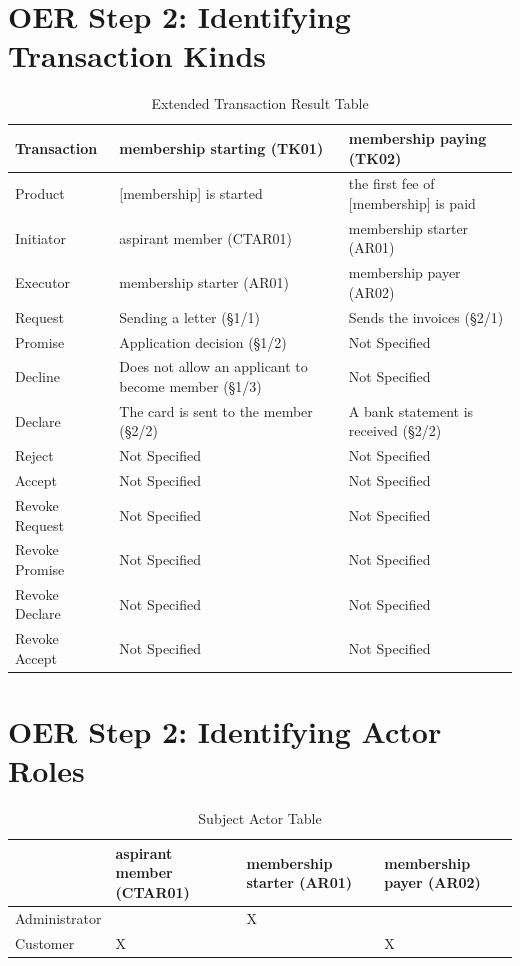 \begin{landscape}
\section{OER Step 2: Identifying Transaction Kinds}

\begin{table}[h]
\caption{Extended Transaction Result Table}
\label{tab:etrt}
\begin{tabular}{|l||l|l|}
\hline
Transaction  & membership starting (TK01) & membership paying (TK02) \\ \hline
Product      & [membership] is started  & the first fee of [membership] is paid \\ \hline
Initiator      & aspirant member (CTAR01)   &  membership starter (AR01)\\ \hline
Executor       & membership starter (AR01) & membership payer (AR02)       \\ \hline
Request        & Sending a letter (\S1/1)  & Sends the invoices (\S2/1)   \\ \hline
Promise        &  Application decision  (\S1/2)  &  Not Specified    \\ \hline
Decline        &  Does not allow an applicant to become member (\S1/3)  & Not Specified  \\ \hline
Declare        & The card is sent to the member (\S2/2) & A bank statement is received  (\S2/2) \\ \hline
Reject         &  Not Specified             &  Not Specified   \\ \hline
Accept         & Not Specified  &  Not Specified  \\ \hline
Revoke Request & Not Specified                   & Not Specified        \\ \hline
Revoke Promise & Not Specified                   &  Not Specified       \\ \hline
Revoke Declare & Not Specified                    &  Not Specified      \\ \hline
Revoke Accept  &  Not Specified             &   Not Specified             \\ \hline
\end{tabular}
\end{table}

\section{OER Step 2: Identifying Actor Roles}

\begin{table}[h]
\caption{Subject Actor Table}
\label{tab:subjectactortable}
\begin{tabular}{|l|l|l|l|}
\hline
  & aspirant member (CTAR01)       & membership starter (AR01)  & membership payer (AR02)  \\ \hline
Administrator   &  & X  &   \\ \hline
Customer & X &  & X \\ \hline
\end{tabular}
\end{table}

\end{landscape}

